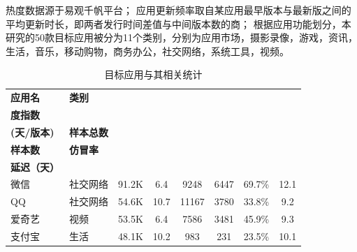 热度数据源于易观千帆平台；
应用更新频率取自某应用最早版本与最新版之间的平均更新时长，即两者发行时间差值与中间版本数的商；
根据应用功能划分，本研究的50款目标应用被分为11个类别，分别为应用市场，摄影录像，游戏，资讯，生活，音乐，移动购物，商务办公，社交网络，系统工具，视频。

\begin{ThreePartTable}
    \centering
    \renewcommand{\arraystretch}{1.05}
    \footnotesize
    \setlength{\belowcaptionskip}{-5pt}
    \vspace{1mm}
    \begin{longtable}{l l c c c c c c}
        \caption{目标应用与其相关统计}\label{table:data-statistics}                                                                                                                                      \\
        \toprule
        {\bf 应用名}                    & {\bf 类别} & \begin{tabular}[c]{@{}c@{}}{\bf 月度热} \\ {\bf 度指数} \end{tabular} & \begin{tabular}[c]{@{}c@{}}{\bf 更新频率} \\ {\bf (天/版本)} \end{tabular} & {\bf 样本总数} & \begin{tabular}[c]{@{}c@{}}{\bf 仿冒} \\ {\bf 样本数} \end{tabular} & {\bf 仿冒率} & \begin{tabular}[c]{@{}c@{}}{\bf 平均仿冒} \\ {\bf 延迟（天）} \end{tabular} \\
        \midrule
        微信                            & 社交网络   & 91.2K                      & 6.4                        & 9248           & 6447                       & 69.7\%       & 12.1                       \\
        \rowcolor{gray!15} QQ           & 社交网络   & 54.6K                      & 10.7                       & 11167          & 3780                       & 33.8\%       & 9.2                        \\
        爱奇艺                          & 视频       & 53.5K                      & 6.4                        & 7586           & 3481                       & 45.9\%       & 9.3                        \\
        \rowcolor{gray!15} 支付宝       & 生活       & 48.1K                      & 10.2                       & 983            & 231                        & 23.5\%       & 10.1                       \\

\end{longtable}
\end{ThreePartTable}
